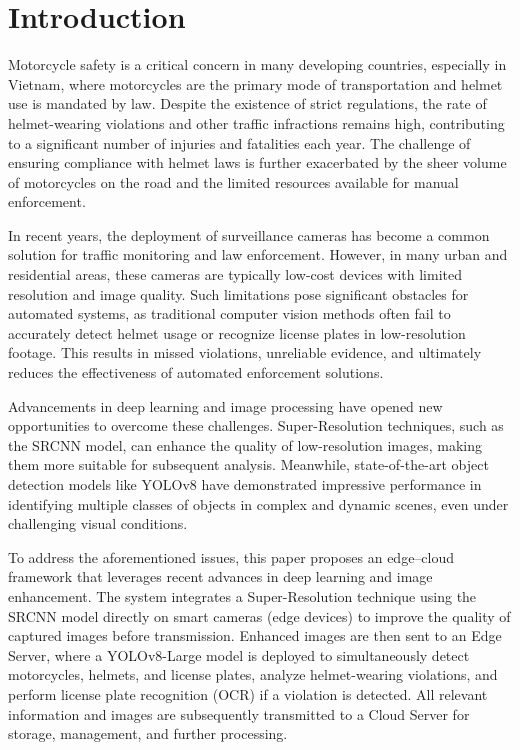 \documentclass[conference]{IEEEtran}
\begin{document}
\section{Introduction}
\label{intro}

Motorcycle safety is a critical concern in many developing countries, especially in Vietnam, where motorcycles are the primary mode of transportation and helmet use is mandated by law. Despite the existence of strict regulations, the rate of helmet-wearing violations and other traffic infractions remains high, contributing to a significant number of injuries and fatalities each year. The challenge of ensuring compliance with helmet laws is further exacerbated by the sheer volume of motorcycles on the road and the limited resources available for manual enforcement.

In recent years, the deployment of surveillance cameras has become a common solution for traffic monitoring and law enforcement. However, in many urban and residential areas, these cameras are typically low-cost devices with limited resolution and image quality. Such limitations pose significant obstacles for automated systems, as traditional computer vision methods often fail to accurately detect helmet usage or recognize license plates in low-resolution footage. This results in missed violations, unreliable evidence, and ultimately reduces the effectiveness of automated enforcement solutions.

Advancements in deep learning and image processing have opened new opportunities to overcome these challenges. Super-Resolution techniques, such as the SRCNN model, can enhance the quality of low-resolution images, making them more suitable for subsequent analysis. Meanwhile, state-of-the-art object detection models like YOLOv8 have demonstrated impressive performance in identifying multiple classes of objects in complex and dynamic scenes, even under challenging visual conditions.

To address the aforementioned issues, this paper proposes an edge–cloud framework that leverages recent advances in deep learning and image enhancement. The system integrates a Super-Resolution technique using the SRCNN model directly on smart cameras (edge devices) to improve the quality of captured images before transmission. Enhanced images are then sent to an Edge Server, where a YOLOv8-Large model is deployed to simultaneously detect motorcycles, helmets, and license plates, analyze helmet-wearing violations, and perform license plate recognition (OCR) if a violation is detected. All relevant information and images are subsequently transmitted to a Cloud Server for storage, management, and further processing.
\end{document}
